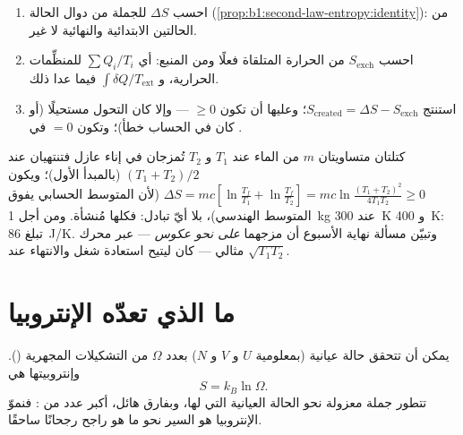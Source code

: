 \begin{method}\label{met:b1:second-law-entropy:method}
\begin{enumerate}
  \item احسب $\Delta S$ للجملة من دوال الحالة
        (\cref{prop:b1:second-law-entropy:identity}): من الحالتين
        الابتدائية والنهائية لا غير.
  \item احسب $S_{\mathrm{exch}}$ من الحرارة المتلقاة فعلًا ومن
         المنبع: أي $\sum Q_i/T_i$ للمنظِّمات الحرارية،
        و $\int\delta Q/T_{\mathrm{ext}}$ فيما عدا ذلك.
  \item استنتج $S_{\mathrm{created}} = \Delta S - S_{\mathrm{exch}}$؛ وعليها أن
        تكون $\geq 0$ --- وإلا كان التحول مستحيلًا (أو كان في الحساب
        خطأ)؛ وتكون $= 0$ في .
\end{enumerate}
\end{method}

\begin{example}\label{ex:b1:second-law-entropy:mixing}
كتلتان متساويتان $m$ من الماء عند $T_1$ و $T_2$ تُمزجان في إناء عازل فتنتهيان عند
$(T_1 + T_2)/2$ (بالمبدأ الأول)؛ ويكون $\Delta S = mc[\ln\frac{T_f}{T_1} + \ln\frac{T_f}{T_2}]
= mc\ln\frac{(T_1 + T_2)^2}{4T_1T_2} \geq 0$ (لأن المتوسط الحسابي يفوق المتوسط
الهندسي)، بلا أيّ تبادل: فكلها مُنشأة. ومن أجل \qty{1}{kg} عند \qty{300}{K} و
\qty{400}{K}: تبلغ \qty{86}{J/K}. وتبيّن مسألة نهاية الأسبوع أن مزجهما
\emph{على نحو عكوس} --- عبر محرك مثالي --- كان ليتيح
استعادة شغل والانتهاء عند $\sqrt{T_1T_2}$.
\end{example}

\section{ما الذي تعدّه الإنتروبيا}

\begin{proposition}\label{prop:b1:second-law-entropy:boltzmann}
يمكن أن تتحقق حالة عيانية (بمعلومية $U$ و $V$ و $N$) بعدد
$\Omega$ من التشكيلات المجهرية (\emph{}). وإنتروبيتها هي
\[
S = k_B\ln\Omega .
\]
تتطور جملة معزولة نحو الحالة العيانية التي لها، وبفارق هائل،
أكبر عدد من : فنموّ الإنتروبيا هو السير نحو ما
هو راجح رجحانًا ساحقًا.
\end{proposition}
\admitted

